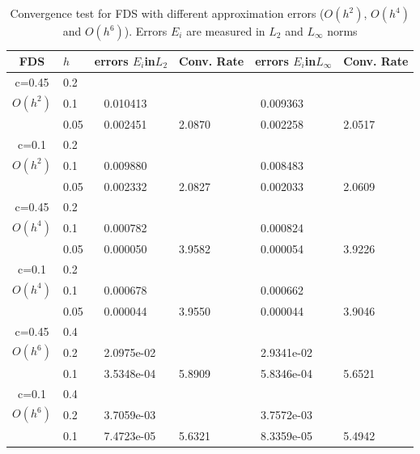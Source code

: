 \documentclass{article}
\begin{document}
\begin{center}
\begin{table}[ht]
\centering
		\begin{tabular}{||c|l|ll|ll||}
			\hline
			\hline
      FDS       & $h$ &errors $E_i$in$L_2$&Conv. Rate& errors $E_i$in$L_\infty$&Conv. Rate\\
   			\hline 
					\hline 
      c=0.45    &0.2    &             &            &           &   \\
   $O(h^2)$     &0.1    &~ 0.010413  &            &~0.009363 &   \\
                &0.05   &~ 0.002451  &2.0870  &~0.002258 & 2.0517 \\
               	 \hline 
     c=0.1      &0.2   &             &           &                & \\
     $O(h^2)$   &0.1   &~ 0.009880  &             &~0.008483      &    \\
                &0.05  &~ 0.002332 & 2.0827       &~0.002033      & 2.0609  \\
			\hline
			\hline 	
      c=0.45    &0.2   &            &            &             &    \\
       $O(h^4)$ &0.1   &~ 0.000782   &           &~0.000824  &   \\
                &0.05  &~ 0.000050 & 3.9582    &~0.000054  & 3.9226  \\
					  			\hline 	
     c=0.1      &0.2  &            &               &               &     \\
     $O(h^4)$  &0.1   &~ 0.000678  &              &~0.000662      &        \\
               &0.05  &~ 0.000044 &3.9550        &~0.000044 &  3.9046        \\
			\hline
    \hline
   c=0.45       &0.4   &            &        &                  &      \\
     $O(h^6)$   &0.2   &~ 2.0975e-02 &           &~2.9341e-02      &       \\
     &0.1  &~ 3.5348e-04 &5.8909  &~5.8346e-04 & 5.6521         \\
	  \hline
   c=0.1       &0.4   &             &        &               &        \\
     $O(h^6)$  &0.2   &~ 3.7059e-03  &        &~3.7572e-03     &       \\
   &0.1  &~ 7.4723e-05 &5.6321  &~8.3359e-05&   5.4942       \\
	   \hline
			\hline 
		\end{tabular}
		\caption{Convergence test for  FDS with different approximation errors ($O(h^{2})$, $O(h^{4})$ and $O(h^{6})$). Errors $E_i$ are measured in $L_2$ and $L_\infty$ norms}

\label{tab:a}
\end{table}
\end{center}
\end{document}
